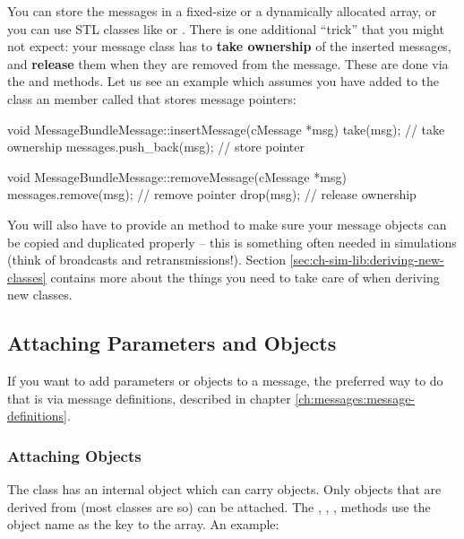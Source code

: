 You can store the messages in a fixed-size or a dynamically allocated
array, or you can use STL classes like  or .
There is one additional ``trick'' that you might not expect: your message
class has to \textbf{take ownership} of the inserted messages, and
\textbf{release} them when they are removed from the message. These are
done via the  and  methods. Let us see
an example which assumes you have added to the class an  member
called  that stores message pointers:

\begin{cpp}
void MessageBundleMessage::insertMessage(cMessage *msg)
{
    take(msg);  // take ownership
    messages.push_back(msg);  // store pointer
}

void MessageBundleMessage::removeMessage(cMessage *msg)
{
    messages.remove(msg);  // remove pointer
    drop(msg);  // release ownership
}
\end{cpp}

You will also have to provide an  method to
make sure your message objects can be copied and duplicated
properly -- this is something often needed in simulations
(think of broadcasts and retransmissions!). Section
\ref{sec:ch-sim-lib:deriving-new-classes} contains more 
about the things you need to take care of when deriving new classes.



\subsection{Attaching Parameters and Objects}

If you want to add parameters or objects to a message, the preferred
way to do that is via message definitions, described in chapter
\ref{ch:messages:message-definitions}.


\subsubsection{Attaching Objects}

The  class has an internal  object which can
carry objects. Only objects
that are derived from  (most {\opp} classes are so) can be attached.
The , , ,
 methods use the object name
as the key to the array. An example:

